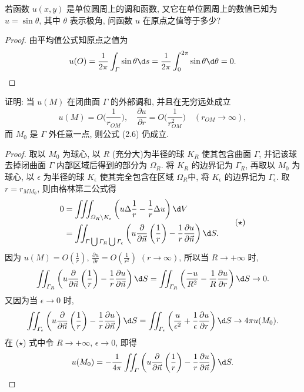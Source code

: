 \begin{exercise}
  若函数 $u(x,y)$ 是单位圆周上的调和函数, 又它在单位圆周上的数值已知为 $u=\sin\theta$,
  其中 $\theta$ 表示极角, 问函数 $u$ 在原点之值等于多少?
\end{exercise}

\begin{proof}
  由平均值公式知原点之值为
  \[u(O) = \frac{1}{2\pi}\int_{\varGamma}\sin\theta\d s
    = \frac{1}{2\pi}\int_0^{2\pi}\sin\theta\d\theta = 0.\qedhere\]
\end{proof}


\begin{exercise}[4]
  证明: 当 $u(M)$ 在闭曲面 $\varGamma$ 的外部调和, 并且在无穷远处成立
  \[u(M) = O\biggl(\frac{1}{r_{OM}}\biggr),\quad
    \frac{\partial u}{\partial r} = O\biggl(\frac{1}{r_{OM}^2}\biggr)\quad
    (r_{OM}\to\infty),\]
  而 $M_0$ 是 $\varGamma$ 外任意一点, 则公式 (2.6) 仍成立.
\end{exercise}

\begin{proof}
  取以 $M_0$ 为球心, 以 $R$ (充分大)为半径的球 $K_R$ 使其包含曲面 $\varGamma$,
  并记该球去掉闭曲面 $\varGamma$ 内部区域后得到的部分为 $\varOmega_R$. 将 $K_R$ 的边界记为 $\varGamma_R$,
  再取以 $M_0$ 为球心, 以 $\epsilon$ 为半径的球 $K_{\epsilon}$ 使其完全包含在区域 $\varOmega_R$中,
  将 $K_{\epsilon}$ 的边界记为 $\varGamma_{\epsilon}$.
  取 $r=r_{MM_0}$, 则由格林第二公式得
  \begin{equation}
    \begin{aligned}
    0 & = \iiint_{\varOmega_R\setminus K_{\epsilon}}\left(u\Delta\frac{1}{r}
        - \frac{1}{r}\Delta u\right)\d V \\
      & = \iint_{\varGamma\bigcup\varGamma_R\bigcup\varGamma_{\epsilon}}\left(u\frac{\partial}{\partial\vec{n}}\left(\frac{1}{r}\right)-\frac{1}{r}\frac{\partial u}{\partial\vec{n}}\right)\d S.
    \end{aligned} \tag{$\star$}
  \end{equation}
  因为 $u(M)=O(\frac{1}{r})$, $\frac{\partial u}{\partial r}=O(\frac{1}{r^2})$ $(r\to\infty)$,
  所以当 $R\to +\infty$ 时,
  \[\iint_{\varGamma_R}\left(u\frac{\partial}{\partial\vec{n}}\left(\frac{1}{r}\right)
    - \frac{1}{r}\frac{\partial u}{\partial\vec{n}}\right)\d S
    = \iint_{\varGamma_R}\left(\frac{-u}{R^2}-\frac{1}{R}\frac{\partial u}{\partial r}\right)\d S\to 0.\]
  又因为当 $\epsilon\to 0$ 时,
  \[\iint_{\varGamma_{\epsilon}}\left(u\frac{\partial}{\partial\vec{n}}\left(\frac{1}{r}\right)
    - \frac{1}{r}\frac{\partial u}{\partial\vec{n}}\right)\d S
    = \iint_{\varGamma_{\epsilon}}\left(\frac{u}{\epsilon^2}
    + \frac{1}{\epsilon}\frac{\partial u}{\partial r}\right)\d S
    \to 4\pi u(M_0).\]
  在 ($\star$) 式中令 $R\to +\infty$, $\epsilon\to 0$, 即得
  \[u(M_0)
  =-\frac{1}{4\pi}\iint_{\varGamma}\left(u\frac{\partial}{\partial\vec{n}}\left(\frac{1}{r}\right)
  -\frac{1}{r}\frac{\partial u}{\partial\vec{n}}\right)\d S. \qedhere\]
\end{proof}


